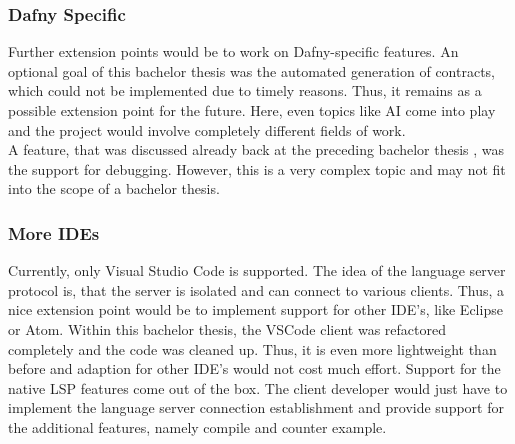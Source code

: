 \subsubsection{Dafny Specific}
Further extension points would be to work on Dafny-specific features.
An optional goal of this bachelor thesis was the automated generation of contracts, which could not be implemented due to timely reasons.
Thus, it remains as a possible extension point for the future.
Here, even topics like AI come into play and the project would involve completely different fields of work.\\

A feature, that was discussed already back at the preceding bachelor thesis \cite{ba}, was the support for debugging.
However, this is a very complex topic and may not fit into the scope of a bachelor thesis.

\subsubsection{More IDEs}
Currently, only Visual Studio Code is supported.
The idea of the language server protocol is, that the server is isolated and can connect to various clients.
Thus, a nice extension point would be to implement support for other IDE's, like Eclipse or Atom.
Within this bachelor thesis, the VSCode client was refactored completely and the code was cleaned up.
Thus, it is even more lightweight than before and adaption for other IDE's would not cost much effort.
Support for the native LSP features come out of the box.
The client developer would just have to implement the language server connection establishment and provide support for the additional features, namely compile and counter example.

